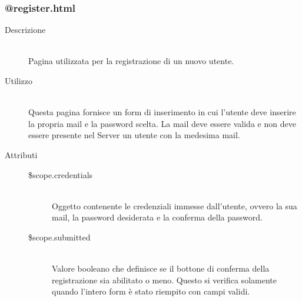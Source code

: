 \subsubsection{@register.html}
\begin{description}
	\item[Descrizione] \hfill \\
	Pagina utilizzata per la registrazione di un nuovo utente.
	\item[Utilizzo] \hfill \\
	Questa pagina fornisce un form di inserimento in cui l'utente deve inserire la propria mail e la password scelta. La mail deve essere valida e non deve essere presente nel Server un utente con la medesima mail.
	\item[Attributi] \hfill
 	\begin{description}
 		\item[\$scope.credentials] \hfill \\
 		Oggetto contenente le credenziali immesse dall'utente, ovvero la sua mail, la password desiderata e la conferma della password.
 		\item[\$scope.submitted] \hfill \\
 		Valore booleano che definisce se il bottone di conferma della registrazione sia abilitato o meno. Questo si verifica solamente quando l'intero form è stato riempito con campi validi.
 	\end{description}
\end{description}

